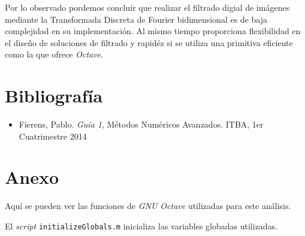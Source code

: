 \documentclass{article}
\begin{document}
\begin{multicols}{2}




\par Por lo observado pordemos concluir que realizar el filtrado digial de imágenes mediante la Transformada Discreta de Fourier bidimensional es de baja complejidad en su implementación. Al mismo tiempo proporciona flexibilidad en el diseño de soluciones de filtrado y rapidéz si se utiliza una primitiva eficiente como la que ofrece \textit{Octave}.\\

\end{multicols}

\section{Bibliografía} 

\begin{itemize}
  \item Fierens, Pablo. \textit{Guía 1}, Métodos Numéricos Avanzados. ITBA, 1er Cuatrimestre 2014

\end{itemize}

\clearpage

\section{Anexo}
\par Aquí se pueden ver las funciones de \textit{GNU Octave} utilizadas para este análisis.\\

\par El \textit{script} \verb+initializeGlobals.m+ inicializa las variables globadas utilizadas.
\end{document}
